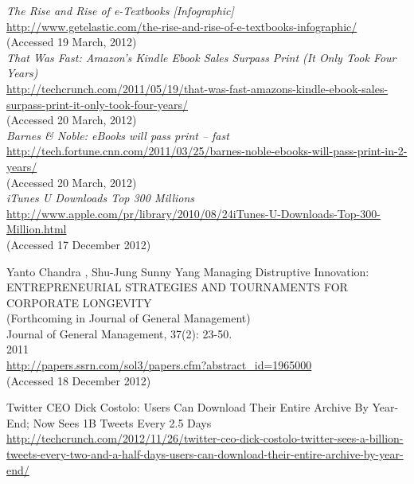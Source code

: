 \documentclass[a4paper,10pt]{book}
\begin{document}
\begin{thebibliography}{9}
   \emph{The Rise and Rise of e-Textbooks [Infographic]}\\
   \url{http://www.getelastic.com/the-rise-and-rise-of-e-textbooks-infographic/}\\
  (Accessed 19 March, 2012)\\

  \emph{That Was Fast: Amazon's Kindle Ebook Sales Surpass Print (It Only Took Four Years)}\\
  \url{http://techcrunch.com/2011/05/19/that-was-fast-amazons-kindle-ebook-sales-surpass-print-it-only-took-four-years/}\\
  (Accessed 20 March, 2012)\\




  \emph{Barnes \& Noble: eBooks will pass print -- fast}\\
  \url{http://tech.fortune.cnn.com/2011/03/25/barnes-noble-ebooks-will-pass-print-in-2-years/}\\
  (Accessed 20 March, 2012)\\


  \emph{iTunes U Downloads Top 300 Millions}\\
  \url{http://www.apple.com/pr/library/2010/08/24iTunes-U-Downloads-Top-300-Million.html}\\
  (Accessed 17 December 2012)

Yanto Chandra , Shu-Jung Sunny Yang
Managing Distruptive Innovation: \\ 
ENTREPRENEURIAL STRATEGIES AND TOURNAMENTS FOR CORPORATE LONGEVITY\\
(Forthcoming in Journal of General Management) \\
Journal of General Management, 37(2): 23-50.\\
2011\\
\url{http://papers.ssrn.com/sol3/papers.cfm?abstract_id=1965000}\\
(Accessed 18 December 2012)

Twitter CEO Dick Costolo: Users Can Download Their Entire Archive By Year-End; Now Sees 1B Tweets Every 2.5 Days \\
\url{http://techcrunch.com/2012/11/26/twitter-ceo-dick-costolo-twitter-sees-a-billion-tweets-every-two-and-a-half-days-users-can-download-their-entire-archive-by-year-end/}\\


\end{thebibliography}
\end{document}

